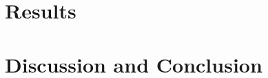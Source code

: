 \documentclass{article}
\theoremstyle{definition}
\theoremstyle{remark}
\begin{document}
\section{Results}


\section{Discussion and Conclusion}



\clearpage

\begingroup
\small


\endgroup

\clearpage
\appendix
\setcounter{figure}{0}
\setcounter{table}{0}
\renewcommand{\thefigure}{S\arabic{figure}}
\renewcommand{\thetable}{S\arabic{table}}


\end{document}
